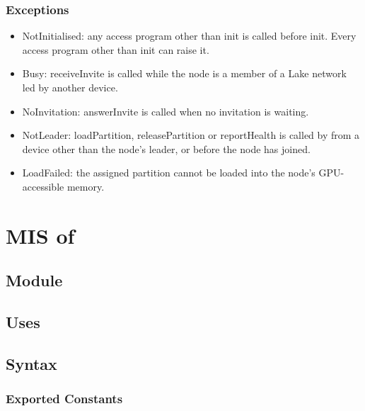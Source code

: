 \documentclass[12pt, titlepage]{article}
\begin{document}
\subsubsection{Exceptions}

\begin{itemize}
  \item NotInitialised: any access program other than init is called before
    init. Every access program other than init can raise it.
  \item Busy: receiveInvite is called while the node is a member of a Lake network led
    by another device.
  \item NoInvitation: answerInvite is called when no invitation is waiting.
  \item NotLeader: loadPartition, releasePartition or reportHealth is called by from a device other than the
    node's leader, or before the node has joined.
  \item LoadFailed: the assigned partition cannot be loaded into the node's
    GPU-accessible memory.
\end{itemize}

\newpage

\section{MIS of } \label{Module} 



\subsection{Module}


\subsection{Uses}


\subsection{Syntax}

\subsubsection{Exported Constants}
\end{document}
